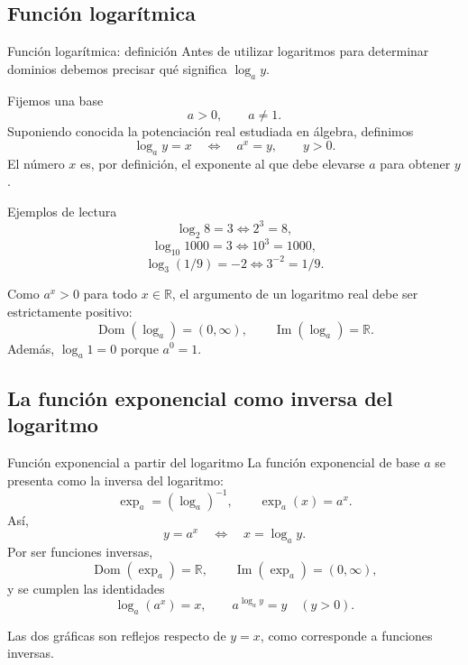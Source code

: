 \documentclass[aspectratio=169,10pt]{beamer}
\newcommand{\R}{\mathbb{R}}
\newcommand{\Dom}{\operatorname{Dom}}
\newcommand{\Ima}{\operatorname{Im}}
\begin{document}
\subsection*{Función logarítmica}
\begin{frame}{Función logarítmica: definición}
Antes de utilizar logaritmos para determinar dominios debemos precisar qué
significa $\log_a y$.

Fijemos una base
\[
a>0,\qquad a\neq1.
\]
Suponiendo conocida la potenciación real estudiada en álgebra, definimos
\[
\boxed{\log_a y=x\quad\Longleftrightarrow\quad a^x=y},\qquad y>0.
\]
El número $x$ es, por definición, el exponente al que debe elevarse $a$ para
obtener $y$.

\begin{exampleblock}{Ejemplos de lectura}
\[
\log_2 8=3\Longleftrightarrow2^3=8,
\]
\[
\log_{10}1000=3\Longleftrightarrow10^3=1000,
\]
\[
\log_3(1/9)=-2\Longleftrightarrow3^{-2}=1/9.
\]
\end{exampleblock}

Como $a^x>0$ para todo $x\in\R$, el argumento de un logaritmo real debe ser
estrictamente positivo:
\[
\boxed{\Dom(\log_a)=(0,\infty)},\qquad
\boxed{\Ima(\log_a)=\R}.
\]
Además, $\log_a1=0$ porque $a^0=1$.
\end{frame}

\subsection*{La función exponencial como inversa del logaritmo}
\begin{frame}{Función exponencial a partir del logaritmo}
La función exponencial de base $a$ se presenta como la inversa del logaritmo:
\[
\boxed{\exp_a=(\log_a)^{-1}},
\qquad
\boxed{\exp_a(x)=a^x}.
\]
Así,
\[
\boxed{y=a^x\quad\Longleftrightarrow\quad x=\log_a y}.
\]
Por ser funciones inversas,
\[
\Dom(\exp_a)=\R,
\qquad
\Ima(\exp_a)=(0,\infty),
\]
y se cumplen las identidades
\[
\log_a(a^x)=x,
\qquad
a^{\log_a y}=y\quad(y>0).
\]

\begin{center}
\end{center}
Las dos gráficas son reflejos respecto de $y=x$, como corresponde a funciones
inversas.
\end{frame}
\end{document}
